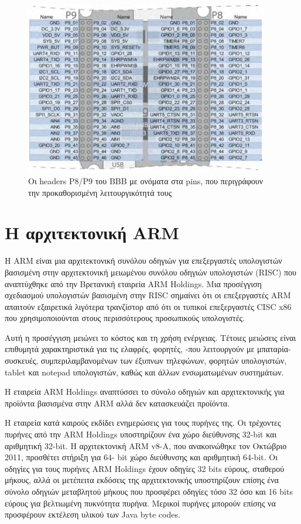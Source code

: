 \documentclass[12pt, a4paper, oneside]{report}
\begin{document}
\begin{figure}
\centering
\includegraphics[width=0.95\textwidth]{eikona_22}
\caption[Οι headers P8\slash P9 του BBB]{Οι headers P8\slash P9 του BBB με ονόματα στα pins, που περιγράφουν την προκαθορισμένη λειτουργικότητά τους\cite{46}}\label{eik22}
\end{figure}

\section{Η αρχιτεκτονική ARM}

Η ARM είναι μια αρχιτεκτονική συνόλου οδηγιών για επεξεργαστές υπολογιστών βασισμένη στην αρχιτεκτονική μειωμένου συνόλου οδηγιών υπολογιστών (RISC) που αναπτύχθηκε από την Βρετανική εταιρεία ARM Holdings. Μια προσέγγιση σχεδιασμού υπολογιστών βασισμένη στην RISC σημαίνει ότι οι επεξεργαστές ARM απαιτούν εξαιρετικά λιγότερα τρανζίστορ από ότι οι τυπικοί επεξεργαστές CISC x86 που χρησιμοποιούνται στους περισσότερους προσωπικούς υπολογιστές.

Αυτή η προσέγγιση μειώνει το κόστος και τη χρήση ενέργειας. Τέτοιες μειώσεις είναι επιθυμητά χαρακτηριστικά για τις ελαφρές, φορητές, -που λειτουργούν με μπαταρία- συσκευές, συμπεριλαμβανομένων των έξυπνων τηλεφώνων, φορητών υπολογιστών, tablet και notepad υπολογιστών, καθώς και άλλων ενσωματωμένων συστημάτων.

Η εταιρεία ARM Holdings αναπτύσσει το σύνολο οδηγιών και αρχιτεκτονικής για προϊόντα βασισμένα στην ARM αλλά δεν κατασκευάζει προϊόντα.

Η εταιρεία κατά καιρούς εκδίδει ενημερώσεις για τους πυρήνες της. Οι τρέχοντες πυρήνες από την ARM Holdings υποστηρίζουν ένα χώρο διεύθυνσης 32-bit και αριθμητική 32-bit. Η αρχιτεκτονική ARM v8-A, που ανακοινώθηκε τον Οκτώβριο 2011, προσθέτει στήριξη για 64- bit χώρο διεύθυνσης και αριθμητική 64-bit. Οι οδηγίες για τους πυρήνες ARM Holdings έχουν οδηγίες 32 bits εύρους, σταθερού μήκους, αλλά οι μετέπειτα εκδόσεις της αρχιτεκτονικής υποστηρίζουν επίσης ένα σύνολο οδηγιών μεταβλητού μήκους που προσφέρει οδηγίες τόσο 32 όσο και 16 bits εύρους για βελτιωμένη πυκνότητα πυρήνα. Μερικοί πυρήνες μπορούν επίσης να προσφέρουν εκτέλεση υλικού των Java byte codes.
\end{document}
